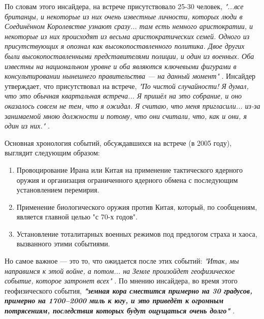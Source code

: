 \documentclass[10pt,twocolumn,letterpaper]{article}
\begin{document}
По словам этого инсайдера, на встрече присутствовало 25-30 человек, \textit{"...все британцы, и некоторые из них очень известные личности, которых люди в Соединённом Королевстве узнают сразу... там есть немного аристократии, и некоторые из них происходят из весьма аристократических семей. Одного из присутствующих я опознал как высокопоставленного политика. Двое других были высокопоставленными представителями полиции, и один из военных. Оба известны на национальном уровне и оба являются ключевыми фигурами в консультировании нынешнего правительства — на данный момент"} \cite{4}. Инсайдер утверждает, что присутствовал на встрече, \textit{"По чистой случайности! Я думал, что это обычная квартальная встреча... Я пришёл на это собрание, и оно оказалось совсем не тем, что я ожидал. Я считаю, что меня пригласили... из-за занимаемой мною должности и потому, что они считали, что, как и они, я один из них."} \cite{4}.

Основная хронология событий, обсуждавшихся на встрече (в 2005 году), выглядит следующим образом:

\begin{flushleft}
\begin{enumerate}
    \item Провоцирование Ирана или Китая на применение тактического ядерного оружия и организация ограниченного ядерного обмена с последующим установлением перемирия.
    \item Применение биологического оружия против Китая, который, по сообщениям, является главной целью "с 70-х годов".
    \item Установление тоталитарных военных режимов под предлогом страха и хаоса, вызванного этими событиями.
\end{enumerate}
\end{flushleft}

Но самое важное — это то, что ожидается после этих событий: \textit{"Итак, мы направимся к этой войне, а потом... на Земле произойдет геофизическое событие, которое затронет всех"} \cite{4}. По мнению инсайдера, во время этого геофизического события, \textit{\textbf{"земная кора сместится примерно на 30 градусов, примерно на 1700–2000 миль к югу, и это приведёт к огромным потрясениям, последствия которых будут ощущаться очень долго"}} \cite{4}.
\end{document}
